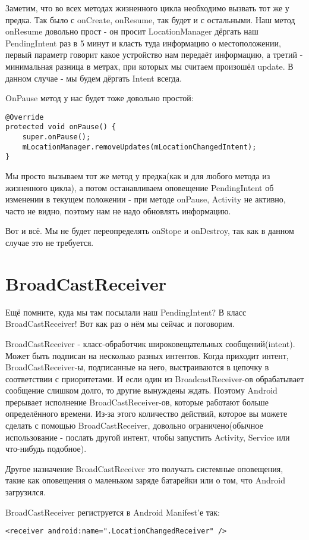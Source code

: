 \documentclass[12 pt]{article}
\begin{document}
    Заметим, что во всех методах жизненного цикла необходимо вызвать тот же у предка. Так было с onCreate, onResume, так будет и с остальными. Наш метод onResume довольно прост - он просит LocationManager дёргать наш PendingIntent раз в 5 минут и класть туда информацию о местоположении, первый параметр говорит какое устройство нам передаёт информацию, а третий - минимальная разница в метрах, при которых мы считаем произошёл update. В данном случае - мы будем дёргать Intent всегда.
    
    OnPause метод у нас будет тоже довольно простой:
    \begin{lstlisting}
@Override
protected void onPause() {
    super.onPause();
    mLocationManager.removeUpdates(mLocationChangedIntent);
} 
    \end{lstlisting}
    
    Мы просто вызываем тот же метод у предка(как и для любого метода из жизненного цикла), а потом останавливаем оповещение PendingIntent об изменении в текущем положении - при методе onPause, Activity не активно, часто не видно, поэтому нам не надо обновлять информацию.
    
    Вот и всё. Мы не будет переопределять onStope и onDestroy, так как в данном случае это не требуется.
\section{BroadCastReceiver} 
    Ещё помните, куда мы там посылали наш PendingIntent? В класс BroadCastReceiver! Вот как раз о нём мы сейчас и поговорим.
    
    BroadCastReceiver - класс-обработчик широковещательных сообщений(intent). Может быть подписан на несколько разных интентов. Когда приходит интент, BroadCastReceiver-ы, подписанные на него, выстраиваются в цепочку в соответствии с приоритетами. И если один из BroadcastReceiver-ов обрабатывает сообщение слишком долго, то другие вынуждены ждать. Поэтому Android прерывает исполнение BroadCastReceiver-ов, которые работают больше определённого времени. Из-за этого количество действий, которое вы можете сделать с помощью BroadCastReceiver, довольно ограничено(обычное использование - послать другой интент, чтобы запустить Activity, Service или что-нибудь подобное).
    
    Другое назначение BroadCastReceiver это получать системные оповещения, такие как оповещения о маленьком заряде батарейки или о том, что Android загрузился.
    
    BroadCastReceiver региструется в Android Manifest'е так:
    \begin{lstlisting}
<receiver android:name=".LocationChangedReceiver" />
    \end{lstlisting} 
    
\end{document}
